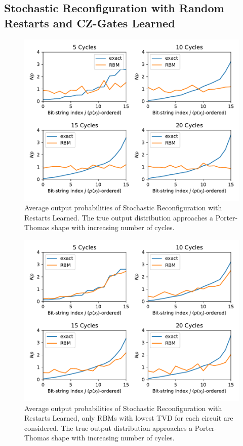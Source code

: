 \subsection{Stochastic Reconfiguration with Random Restarts and CZ-Gates Learned}

\begin{figure}[H]
  \centering
  \includegraphics[width=\textwidth]{figures/results/SR-restarts-learned/avgPDF.pdf}
  \caption[Average output probabilities of Stochastic Reconfiguration with Restarts Learned]{
    Average output probabilities of Stochastic Reconfiguration with Restarts Learned. The true 
    output distribution approaches a Porter-Thomas shape with increasing number of cycles.}
  \label{fig:sr_tvd}
\end{figure}

\begin{figure}[H]
  \centering
  \includegraphics[width=\textwidth]{figures/results/SR-restarts-learned/avgBestPDF.pdf}
  \caption[Averaged best performing output probabilities of Stochastic Reconfiguration with Restarts Learned]{
    Average output probabilities of Stochastic Reconfiguration with Restarts Learned, only RBMs with lowest
    TVD for each circuit are considered. The true 
    output distribution approaches a Porter-Thomas shape with increasing number of cycles.}
  \label{fig:sr_tvd}
\end{figure}

